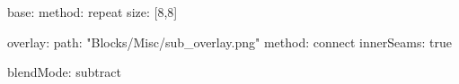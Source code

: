 base:
  method: repeat
  size: [8,8]

overlay:
  path: "Blocks/Misc/sub_overlay.png"
  method: connect
  innerSeams: true

blendMode: subtract
